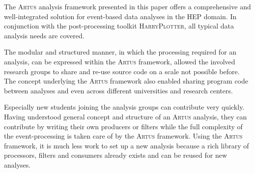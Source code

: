 \documentclass[3p]{elsarticle}
\newcommand{\software}[1]{\textsc{#1}\xspace}
\newcommand{\artus}{\software{Artus}}
\newcommand{\harryplotter}{\software{HarryPlotter}}
\begin{document}
The \artus analysis framework presented in this paper offers a comprehensive and well-integrated solution for event-based data analyses in the HEP domain.
In conjunction with the post-processing toolkit \harryplotter, all typical data analysis needs are covered.

The modular and structured manner, in which the processing required for an analysis, can be expressed within the \artus framework, allowed the involved research groups to share and re-use source code on a scale not possible before.
The concept underlying the \artus framework also enabled sharing program code between analyses and even across different universities and research centers.

Especially new students joining the analysis groups can contribute very quickly.
Having understood general concept and structure of an \artus analysis, they can contribute by writing their own producers or filters while the full complexity of the event-processing is taken care of by the \artus framework.
Using the \artus framework, it is much less work to set up a new analysis because a rich library of processors, filters and consumers already exists and can be reused for new analyses.

\vspace{2cm}

\end{document}
